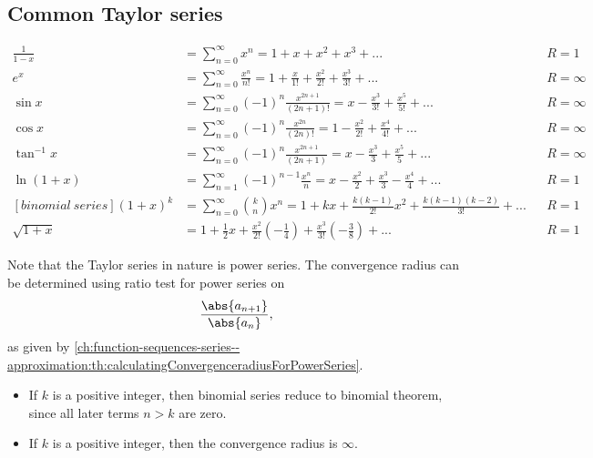 \begin{refsection}
\subsection{Common Taylor series}
\begin{lemma}\label{ch:functional-analysis:th:commonTaylorSeries}
	\begin{align*}
	\frac{1}{1-x} &= \sum_{n=0}^\infty x^n = 1 + x + x^2 + x^3 + ... && R=1 \\
	e^x &= \sum_{n=0}^\infty \frac{x^n}{n!} = 1 + \frac{x}{1!} + \frac{x^2}{2!} + \frac{x^3}{3!} + ... && R=\infty \\
	\sin x &=\sum_{n=0}^\infty (-1)^n \frac{x^{2n+1}}{(2n+1)!} = x - \frac{x^3}{3!} + \frac{x^5}{5!} + ... && R=\infty \\
	\cos x &=\sum_{n=0}^\infty (-1)^n \frac{x^{2n}}{(2n)!} = 1 - \frac{x^2}{2!} + \frac{x^4}{4!} + ... && R=\infty \\
	\tan^{-1} x &=\sum_{n=0}^\infty (-1)^n \frac{x^{2n+1}}{(2n+1)} = x - \frac{x^3}{3} + \frac{x^5}{5} + ... && R=\infty \\
	\ln (1 + x) &=\sum_{n=1}^\infty (-1)^{n-1} \frac{x^{n}}{n} = x - \frac{x^2}{2} + \frac{x^3}{3} - \frac{x^4}{4} + ... && R=1 \\
	[binomial~series](1 + x)^k &=\sum_{n=0}^\infty \binom{k}{n}x^n = 1 +kx + \frac{k(k-1)}{2!}x^2 + \frac{k(k-1)(k-2)}{3!} +... && R=1 \\
	\sqrt{1+x} &= 1 + \frac{1}{2}x + \frac{x^2}{2!}(-\frac{1}{4})+\frac{x^3}{3!}(-\frac{3}{8}) + ... && R=1
	\end{align*}
\end{lemma}

\begin{remark}Note that the Taylor series in nature is power series. The convergence radius can be determined using ratio test for power series on $$\frac{\abs{a_{n+1}}}{\abs{a_n}},$$
	as given by \autoref{ch:function-sequences-series--approximation:th:calculatingConvergenceradiusForPowerSeries}.
\end{remark}

\begin{remark}\hfill
	\begin{itemize}
		\item If $k$ is a positive integer, then binomial series reduce to binomial theorem, since all later terms $n > k$ are zero.
		\item If $k$ is a positive integer, then the convergence radius is $\infty$.
	\end{itemize}
\end{remark}



\end{refsection}
